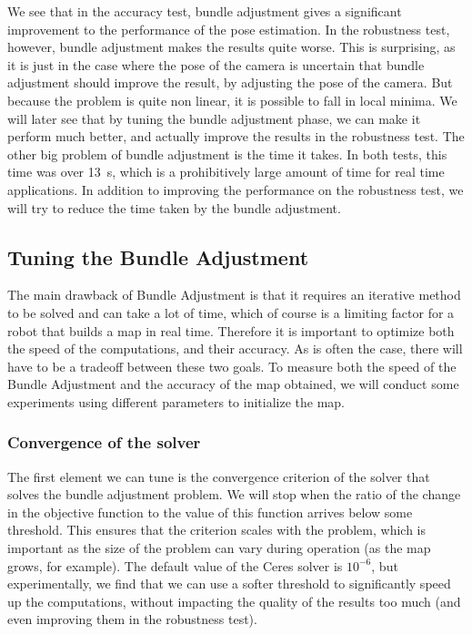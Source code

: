 We see that in the accuracy test, bundle adjustment gives a significant improvement to the performance of the pose estimation. In the robustness test, however, bundle adjustment makes the results quite worse. This is surprising, as it is just in the case where the pose of the camera is uncertain that bundle adjustment should improve the result, by adjusting the pose of the camera. But because the problem is quite non linear, it is possible to fall in local minima. We will later see that by tuning the bundle adjustment phase, we can make it perform much better, and actually improve the results in the robustness test. The other big problem of bundle adjustment is the time it takes. In both tests, this time was over \SI{13}{\second}, which is a prohibitively large amount of time for real time applications. In addition to improving the performance on the robustness test, we will try to reduce the time taken by the bundle adjustment.


\subsection{Tuning the Bundle Adjustment}
The main drawback of Bundle Adjustment is that it requires an iterative method to be solved and can take a lot of time, which of course is a limiting factor for a robot that builds a map in real time. Therefore it is important to optimize both the speed of the computations, and their accuracy. As is often the case, there will have to be a tradeoff between these two goals. To measure both the speed of the Bundle Adjustment and the accuracy of the map obtained, we will conduct some experiments using different parameters to initialize the map.

\subsubsection{Convergence of the solver}
The first element we can tune is the convergence criterion of the solver that solves the bundle adjustment problem. We will stop when the ratio of the change in the objective function to the value of this function arrives below some threshold. This ensures that the criterion scales with the problem, which is important as the size of the problem can vary during operation (as the map grows, for example). The default value of the Ceres solver is $10^{-6}$, but experimentally, we find that we can use a softer threshold to significantly speed up the computations, without impacting the quality of the results too much (and even improving them in the robustness test).

